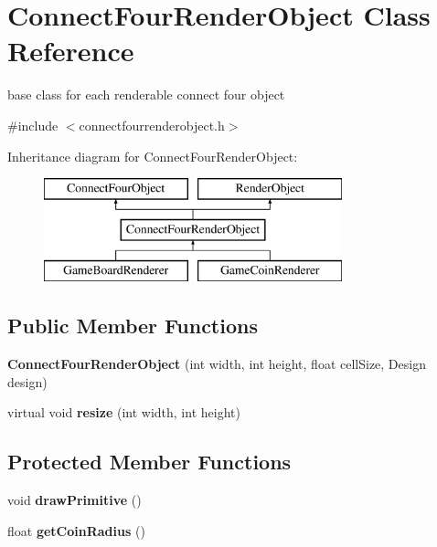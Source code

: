 \hypertarget{class_connect_four_render_object}{\section{Connect\-Four\-Render\-Object Class Reference}
\label{class_connect_four_render_object}
}


base class for each renderable connect four object  




{\ttfamily \#include $<$connectfourrenderobject.\-h$>$}

Inheritance diagram for Connect\-Four\-Render\-Object\-:\begin{figure}[H]
\begin{center}
\leavevmode
\includegraphics[height=3.000000cm]{class_connect_four_render_object}
\end{center}
\end{figure}
\subsection*{Public Member Functions}
\begin{DoxyCompactItemize}
\item 
\hypertarget{class_connect_four_render_object_a8f005868218af313f4d4cbde8041a10f}{{\bfseries Connect\-Four\-Render\-Object} (int width, int height, float cell\-Size, Design design)}\label{class_connect_four_render_object_a8f005868218af313f4d4cbde8041a10f}

\item 
\hypertarget{class_connect_four_render_object_a9b29bbc57d9985db1075a1b147b15801}{virtual void {\bfseries resize} (int width, int height)}\label{class_connect_four_render_object_a9b29bbc57d9985db1075a1b147b15801}

\end{DoxyCompactItemize}
\subsection*{Protected Member Functions}
\begin{DoxyCompactItemize}
\item 
\hypertarget{class_connect_four_render_object_a4b8e9a3cc37ba5b6a6baf341f18f8328}{void {\bfseries draw\-Primitive} ()}\label{class_connect_four_render_object_a4b8e9a3cc37ba5b6a6baf341f18f8328}

\item 
\hypertarget{class_connect_four_render_object_a04ad47593cfd44bdda2ae4ba833f5a18}{float {\bfseries get\-Coin\-Radius} ()}\label{class_connect_four_render_object_a04ad47593cfd44bdda2ae4ba833f5a18}

\end{DoxyCompactItemize}
